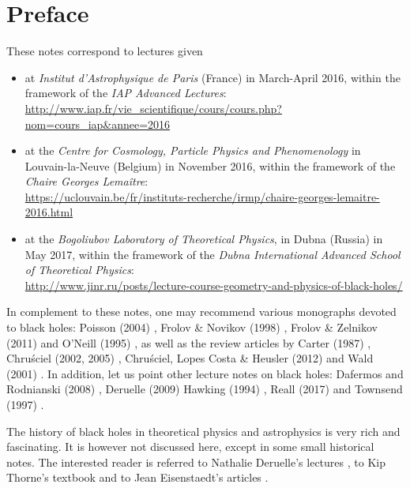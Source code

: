 \chapter*{Preface}

These notes correspond to lectures given
\begin{itemize}
\item at \emph{Institut d'Astrophysique de Paris} (France) in March-April 2016, within the
framework of the \emph{IAP Advanced Lectures}:\\
{\small\url{http://www.iap.fr/vie_scientifique/cours/cours.php?nom=cours_iap&annee=2016}}
\item at the \emph{Centre for Cosmology, Particle Physics and Phenomenology} in Louvain-la-Neuve
(Belgium) in November 2016, within the framework of the \emph{Chaire Georges Lemaître}:\\
{\small \url{https://uclouvain.be/fr/instituts-recherche/irmp/chaire-georges-lemaitre-2016.html}}
\item at the
\emph{Bogoliubov Laboratory of Theoretical Physics}, in Dubna (Russia) in May 2017,
within the framework of the \emph{Dubna International Advanced School of Theoretical Physics}:\\
{\small\url{http://www.jinr.ru/posts/lecture-course-geometry-and-physics-of-black-holes/}}
\end{itemize}

\vspace{2ex}

In complement to these notes, one may recommend various monographs
devoted to black holes: Poisson (2004) \cite{Poiss04}, Frolov \& Novikov (1998) \cite{FroloN98},
Frolov \& Zelnikov (2011) \cite{FroloZ11} and O'Neill (1995) \cite{ONeil95}, as well as the review
articles by Carter (1987) \cite{Carte87}, Chru\'sciel (2002, 2005) \cite{Chrus02, Chrus05},
Chru\'sciel, Lopes Costa \& Heusler (2012) \cite{ChrusLH12} and Wald (2001) \cite{Wald01}.
In addition, let us point other lecture notes on black holes:
Dafermos and Rodnianski (2008) \cite{DaferR13},  Deruelle (2009) \cite{Derue09}
Hawking (1994) \cite{Hawki94,HawkiP15}, Reall (2017) \cite{Reall16} and Townsend (1997) \cite{Towns97}.

The history of black holes in theoretical physics and astrophysics is
very rich and fascinating. It is however not discussed here, except in some
small historical notes. The interested
reader is referred to Nathalie Deruelle's lectures \cite{Derue09}, to Kip Thorne's
textbook \cite{Thorn94} and to Jean Eisenstaedt's articles \cite{Eisen82,Eisen93}.


